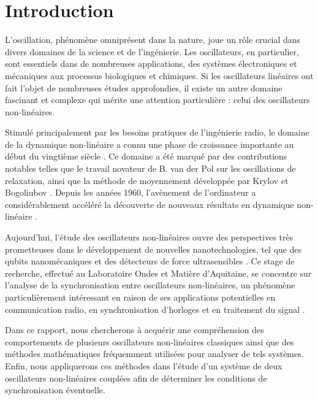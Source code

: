 \chapter{Introduction}
L'oscillation, phénomène omniprésent dans la nature, joue un rôle crucial dans divers domaines de la science et de l'ingénierie. Les oscillateurs, en particulier, sont essentiels dans de nombreuses applications, des systèmes électroniques et mécaniques aux processus biologiques et chimiques. Si les oscillateurs linéaires ont fait l'objet de nombreuses études approfondies, il existe un autre domaine fascinant et complexe qui mérite une attention particulière : celui des oscillateurs non-linéaires.

Stimulé principalement par les besoins pratiques de l'ingénierie radio,
le domaine de la dynamique non-linéaire a connu une phase de croissance importante au début du vingtième siècle \cite{samoilenko_nn_1994}.
Ce domaine a été marqué par des contributions notables telles que le travail novateur de B. van der Pol sur les oscillations de relaxation, ainsi que la méthode de moyennement développée par Krylov et Bogoliubov \cite{mira_historical_1997}. Depuis les années 1960, l'avènement de l'ordinateur a considérablement accéléré la découverte de nouveaux résultats en dynamique non-linéaire \cite{mira_historical_1997}.

Aujourd'hui, l'étude des oscillateurs non-linéaires ouvre des perspectives très prometteuses dans le développement de nouvelles nanotechnologies, tel que des qubits nanomécaniques \cite{pistolesi_proposal_2021} et des détecteurs de force ultrasensibles \cite{moser_ultrasensitive_2013}. 
Ce stage de recherche, effectué au Laboratoire Ondes et Matière d'Aquitaine, se concentre sur l'analyse de la synchronisation entre oscillateurs non-linéaires, un phénomène particulièrement intéressant en raison de ses applications potentielles en communication radio, en synchronisation d'horloges et en traitement du signal \cite{djorwe_self-organized_2020}.

Dans ce rapport, nous chercherons à acquérir une compréhension des 
comportements de plusieurs oscillateurs non-linéaires classiques ainsi que 
des méthodes mathématiques fréquemment utilisées pour analyser de tels systèmes. 
Enfin, nous appliquerons ces méthodes dans l'étude d'un système 
de deux oscillateurs non-linéaires couplées afin de déterminer les conditions de synchronisation éventuelle.


